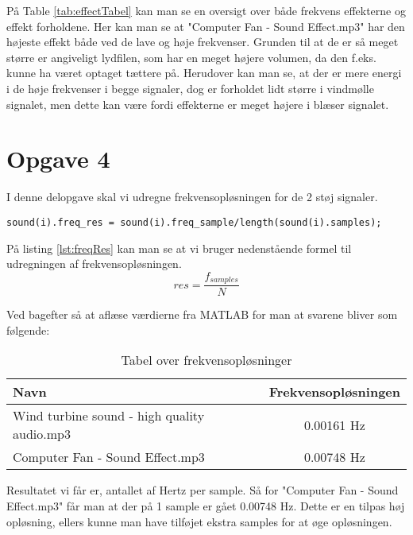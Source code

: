 \documentclass[../main.tex]{subfiles}
\begin{document}
På Table \ref{tab:effectTabel} kan man se en oversigt over både frekvens effekterne og effekt forholdene.
Her kan man se at "Computer Fan - Sound Effect.mp3" har den højeste effekt både ved de lave og høje frekvenser. 
Grunden til at de er så meget større er angiveligt lydfilen, som har en meget højere volumen, da den f.eks. kunne ha været optaget tættere på.
Herudover kan man se, at der er mere energi i de høje frekvenser i begge signaler, dog er forholdet lidt større i vindmølle signalet, men dette kan være fordi effekterne er meget højere i blæser signalet.

\section{Opgave 4}
I denne delopgave skal vi udregne frekvensopløsningen for de 2 støj signaler.

\begin{lstlisting}[caption=Udregning af effektforhold, label=lst:freqRes]
% Calculate the frequency resolution
sound(i).freq_res = sound(i).freq_sample/length(sound(i).samples);
\end{lstlisting}

På listing \ref{lst:freqRes} kan man se at vi bruger nedenstående formel til udregningen af frekvensopløsningen.
\[res = \frac{f_{samples}}{N}\]

Ved bagefter så at aflæse værdierne fra MATLAB for man at svarene bliver som følgende:

\begin{table}[h]
    \centering
    \begin{tabular}{|l|c|}
    \hline
    Navn & Frekvensopløsningen \\ 
    \hline
    Wind turbine sound - high quality audio.mp3 & 0.00161 Hz \\
    \hline
    Computer Fan - Sound Effect.mp3 & 0.00748 Hz \\
    \hline
    \end{tabular}
    \caption{Tabel over frekvensopløsninger}
    \label{tab:freqResTable}
\end{table}

Resultatet vi får er, antallet af Hertz per sample. Så for "Computer Fan - Sound Effect.mp3" får man at der på 1 sample er gået 0.00748 Hz. Dette er en tilpas høj opløsning, ellers kunne man have tilføjet ekstra samples for at øge opløsningen.
\end{document}
